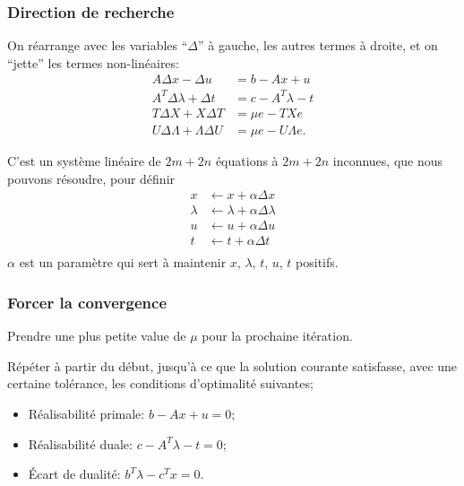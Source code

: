 \documentclass[t, aspectratio=169,usepdftitle=false]{beamer}
\begin{document}
\begin{frame}
\frametitle{Direction de recherche}

On réarrange avec les variables ``$\Delta$'' à gauche, les autres termes à droite, et on ``jette'' les termes non-linéaires:
\begin{align*}
A\Delta x - \Delta u &= b - Ax + u\\
A^T\Delta \lambda + \Delta t &= c - A^T\lambda - t \\
T\Delta X + X \Delta T &= \mu e - TXe \\
U\Delta \Lambda + \Lambda \Delta U  &= \mu e - U\Lambda e.
\end{align*}

\mbox{}

C'est un système linéaire de $2m + 2n$ équations à $2m + 2n$ inconnues, que nous pouvons résoudre, pour définir
\begin{align*}
x &\leftarrow x + \alpha \Delta x \\
\lambda &\leftarrow \lambda + \alpha \Delta \lambda \\
u &\leftarrow u + \alpha \Delta u \\
t &\leftarrow t + \alpha \Delta t \\
\end{align*}
$\alpha$ est un paramètre qui sert à maintenir $x$, $\lambda$, $t$, $u$, $t$ positifs.

\end{frame}

\begin{frame}
\frametitle{Forcer la convergence}

Prendre une plus petite value de $\mu$ pour la prochaine itération.

\mbox{}

Répéter à partir du début, jusqu'à ce que la solution courante satisfasse, avec une certaine tolérance, les conditions d'optimalité suivantes;
\begin{itemize}
\item
Réalisabilité primale: $b - Ax + u = 0$;
\item
Réalisabilité duale: $c - A^T\lambda - t = 0$;
\item
Écart de dualité: $b^T \lambda - c^Tx = 0$.
\end{itemize}

\mbox{}

\end{frame}
\end{document}
